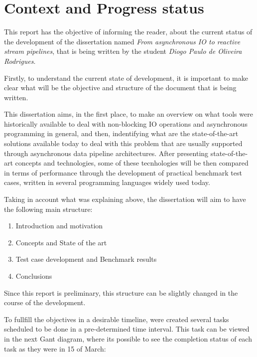 % 
%  
%
\chapter{Context and Progress status}
\label{cha:introduction}


This report has the objective of informing the reader, about the current status of the development of the dissertation named \textit{From asynchronous IO to reactive stream pipelines}, that is being written by the student \textit{Diogo Paulo de Oliveira Rodrigues}.

Firstly, to understand the current state of development, it is important to make clear what will be the objective and structure of the document that is being written.

This dissertation aims, in the first place, to make an overview on what tools were historically available to deal with non-blocking IO operations and asynchronous programming in general, and then, indentifying what are the state-of-the-art solutions available today to deal with this problem that are usually supported through asynchronous data pipeline architectures.
After presenting state-of-the-art concepts and technologies, some of these tecnhologies will be then compared in terms of performance through the development of practical benchmark test cases, written in several programming languages widely used today.

Taking in account what was explaining above, the dissertation will aim to have the following main structure: 

\begin{enumerate}
	\item Introduction and motivation
	\item Concepts and State of the art
	\item Test case development and Benchmark results 
	\item Conclusions
\end{enumerate}

Since this report is preliminary, this structure can be slightly changed in the course of the development.

To fullfill the objectives in a desirable timeline, were created several tasks scheduled to be done in a pre-determined time interval. This task can be viewed in the  
next Gant diagram, where its possible to see the completion status of each task as they were in 15 of March:


